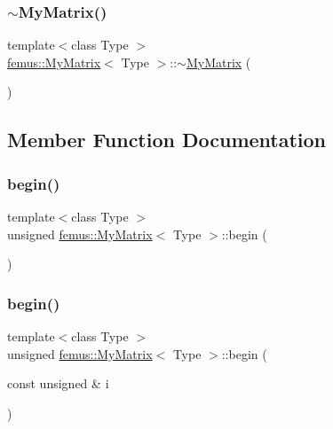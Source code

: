 \subsubsection{\texorpdfstring{$\sim$\+My\+Matrix()}{~MyMatrix()}}
{\footnotesize\ttfamily template$<$class Type $>$ \\
\mbox{\hyperlink{classfemus_1_1_my_matrix}{femus\+::\+My\+Matrix}}$<$ Type $>$\+::$\sim$\mbox{\hyperlink{classfemus_1_1_my_matrix}{My\+Matrix}} (\begin{DoxyParamCaption}{ }\end{DoxyParamCaption})}



\subsection{Member Function Documentation}
\mbox{\label{classfemus_1_1_my_matrix_aeb34d19dc9a44a8cc4839b31cff5d63e}} 
\subsubsection{\texorpdfstring{begin()}{begin()}\hspace{0.1cm}{\footnotesize\ttfamily [1/2]}}
{\footnotesize\ttfamily template$<$class Type $>$ \\
unsigned \mbox{\hyperlink{classfemus_1_1_my_matrix}{femus\+::\+My\+Matrix}}$<$ Type $>$\+::begin (\begin{DoxyParamCaption}{ }\end{DoxyParamCaption})}

\mbox{\label{classfemus_1_1_my_matrix_ab204ed386a67619364bb53449116019d}} 
\subsubsection{\texorpdfstring{begin()}{begin()}\hspace{0.1cm}{\footnotesize\ttfamily [2/2]}}
{\footnotesize\ttfamily template$<$class Type $>$ \\
unsigned \mbox{\hyperlink{classfemus_1_1_my_matrix}{femus\+::\+My\+Matrix}}$<$ Type $>$\+::begin (\begin{DoxyParamCaption}\item[{const unsigned \&}]{i }\end{DoxyParamCaption})}

